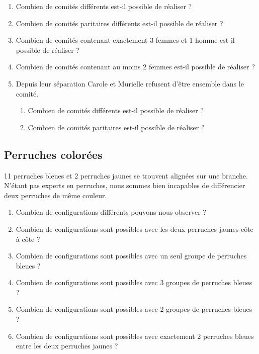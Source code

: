 \documentclass[oneside,12pt]{book}          %
\begin{document}
\begin{enumerate}
    \item Combien de comités différents est-il possible de réaliser ?
    \item Combien de comités paritaires différents est-il possible de réaliser ?
    \item Combien de comités contenant exactement 3 femmes et 1 homme est-il possible de réaliser ?
    \item Combien de comités contenant au moins 2 femmes est-il possible de réaliser ?
    \item Depuis leur séparation Carole et Murielle refusent d'être ensemble dans le comité.
        \begin{enumerate}
            \item Combien de comités différents est-il possible de réaliser ?
            \item Combien de comités paritaires est-il possible de réaliser ?
        \end{enumerate}
\end{enumerate}



\subsection{Perruches colorées}
11 perruches bleues et 2 perruches jaunes se trouvent alignées sur une branche. N'étant pas experts en perruches, nous sommes bien incapables de différencier deux perruches de même couleur.

\begin{enumerate}
    \item Combien de configurations différents pouvons-nous observer ?
    \item Combien de configurations sont possibles avec les deux perruches jaunes côte à côte ?
    \item Combien de configurations sont possibles avec un seul groupe de perruches bleues ?
    \item Combien de configurations sont possibles avec 3 groupes de perruches bleues ?
    \item Combien de configurations sont possibles avec 2 groupes de perruches bleues ?
    \item Combien de configurations sont possibles avec exactement 2 perruches bleues entre les deux perruches jaunes ?
\end{enumerate}
\end{document}
